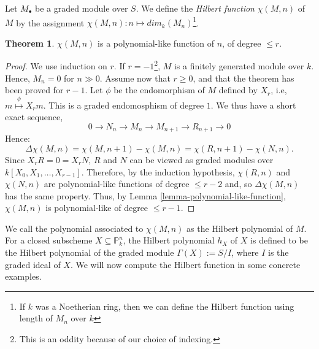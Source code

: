 \documentclass[11pt]{amsart}
\renewcommand{\P}{{\mathbb P}}
\theoremstyle{definition}
\newtheorem{theorem}{Theorem}[section]
\begin{document}
Let $M_{\bullet}$ be a graded module over $S$. We define the \textit{Hilbert function} $\chi(M,n)$ of $M$ by the assignment $\chi(M,n): n\mapsto  dim_k(M_n)$\footnote{If $k$ was a Noetherian ring, then we can define the Hilbert function using length of $M_n$ over $k$}.

\begin{theorem}
	$\chi(M,n)$ is a polynomial-like function of $n$, of degree $\leq r$.
\end{theorem}
\begin{proof}
	We use induction on $r$. If $r=-1$\footnote{This is an oddity because of our choice of indexing.}, $M$ is a finitely generated module over $k$. Hence, $M_n=0$ for $n\gg 0$. Assume now that $r\geq 0$, and that the theorem has been proved for $r-1$. Let $\phi$ be the endomorphism of $M$ defined by $X_r$, i.e, $m\overset{\phi}{\mapsto} X_r m$. This is a graded endomosphism of degree $1$. We thus have a short exact sequence,
	\[0\rightarrow N_n\rightarrow M_n\rightarrow M_{n+1}\rightarrow R_{n+1}\rightarrow 0\]
	Hence:
	\[\Delta\chi(M,n)=\chi(M,n+1)-\chi(M,n)=\chi(R,n+1)-\chi(N,n).\]
	Since $X_r R=0=X_r N$, $R$ and $N$ can be viewed as graded modules over $k[X_0,X_1,\ldots,X_{r-1}]$. Therefore, by the induction hypothesis, $\chi(R,n)$ and $\chi(N,n)$ are polynomial-like functions of degree $\leq r-2$ and, so $\Delta\chi(M,n)$ has the same property. Thus, by Lemma \ref{lemma-polynomial-like-function}, $\chi(M,n)$ is polynomial-like of degree $\leq r-1$.
\end{proof}

We call the polynomial associated to $\chi(M, n)$ as the Hilbert polynomial of $M$. For a closed subscheme $X\subseteq \P_k^n$, the Hilbert polynomial $h_X$ of $X$ is defined to be the Hilbert polynomial of the graded module $\Gamma(X):=S/I$, where $I$ is the graded ideal of $X$.
We will now compute the Hilbert function in some concrete examples.
\end{document}
